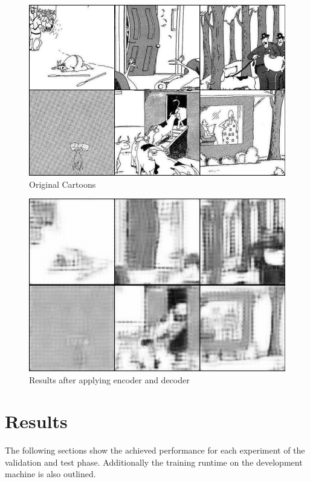 \documentclass[draft,final,oneside]{vutinfth} %
\begin{document}
\begin{figure}
	\centering
  	\includegraphics[width=1.0\textwidth]{graphics/autoencoder_original.png}
	\caption{Original Cartoons}
	\label{fig:autoencoderimageoriginal}
\end{figure}

\begin{figure}
	\centering
  	\includegraphics[width=1.0\textwidth]{graphics/autoencoder_final.png}
	\caption{Results after applying encoder and decoder}
	\label{fig:autoencoderresults}
\end{figure}

\pagebreak
\section{Results}

The following sections show the achieved performance for each experiment of the validation
and test phase. Additionally the training runtime on the development machine is also outlined. 
\end{document}
